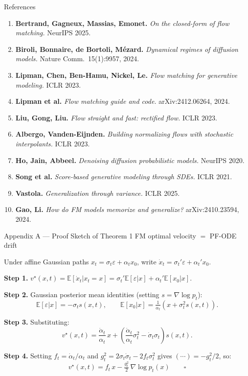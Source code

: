 \documentclass[10pt,aspectratio=169]{beamer}
\newcommand{\E}{\mathbb{E}}
\begin{document}
\begin{frame}{References}
  \footnotesize
  \begin{enumerate}
    \item \textbf{Bertrand, Gagneux, Massias, Emonet.}
      \textit{On the closed-form of flow matching.} NeurIPS 2025.
    \item \textbf{Biroli, Bonnaire, de Bortoli, M{\'e}zard.}
      \textit{Dynamical regimes of diffusion models.}
      Nature Comm.\ 15(1):9957, 2024.
    \item \textbf{Lipman, Chen, Ben-Hamu, Nickel, Le.}
      \textit{Flow matching for generative modeling.} ICLR 2023.
    \item \textbf{Lipman et al.}
      \textit{Flow matching guide and code.} arXiv:2412.06264, 2024.
    \item \textbf{Liu, Gong, Liu.}
      \textit{Flow straight and fast: rectified flow.} ICLR 2023.
    \item \textbf{Albergo, Vanden-Eijnden.}
      \textit{Building normalizing flows with stochastic interpolants.}
      ICLR 2023.
    \item \textbf{Ho, Jain, Abbeel.}
      \textit{Denoising diffusion probabilistic models.} NeurIPS 2020.
    \item \textbf{Song et al.}
      \textit{Score-based generative modeling through SDEs.} ICLR 2021.
    \item \textbf{Vastola.}
      \textit{Generalization through variance.} ICLR 2025.
    \item \textbf{Gao, Li.}
      \textit{How do FM models memorize and generalize?}
      arXiv:2410.23594, 2024.
  \end{enumerate}
\end{frame}

\begin{frame}{Appendix A --- Proof Sketch of Theorem 1}
  {FM optimal velocity $=$ PF-ODE drift}

  Under affine Gaussian paths $x_t=\sigma_t\varepsilon+\alpha_t x_0$,
  write $\dot x_t=\sigma_t'\varepsilon+\alpha_t'x_0$.

  \medskip
  \textbf{Step 1.}
  $v^\star(x,t)=\E[\dot x_t|x_t=x]
    =\sigma_t'\E[\varepsilon|x]+\alpha_t'\E[x_0|x]$.

  \medskip
  \textbf{Step 2.} Gaussian posterior mean identities
  (setting $s=\nabla\log p_t$):
  \[
    \E[\varepsilon|x]=-\sigma_t s(x,t), \qquad
    \E[x_0|x]=\tfrac{1}{\alpha_t}(x+\sigma_t^2 s(x,t)).
  \]

  \textbf{Step 3.} Substituting:
  \[
    v^\star(x,t)
      =\frac{\dot\alpha_t}{\alpha_t}\,x
      +\!\left(\frac{\dot\alpha_t}{\alpha_t}\sigma_t^2
               -\dot\sigma_t\sigma_t\right)s(x,t).
  \]

  \textbf{Step 4.} Setting $f_t=\dot\alpha_t/\alpha_t$ and
  $g_t^2=2\sigma_t\dot\sigma_t-2f_t\sigma_t^2$ gives
  $(\cdots)=-g_t^2/2$, so:
  \[
    \boxed{v^\star(x,t)=f_t\,x-\tfrac{g_t^2}{2}\,\nabla\log p_t(x)}
    \qquad\square
  \]
\end{frame}
\end{document}

